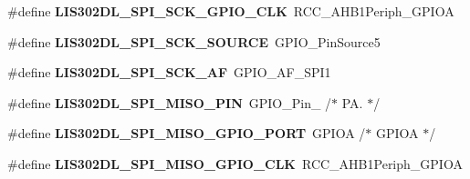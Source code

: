 \begin{DoxyCompactItemize}
\item 
\hypertarget{group___s_t_m32_f4___d_i_s_c_o_v_e_r_y___l_i_s302_d_l___exported___constants_ga1546d6ebad4510d071ac0bd6537f55fb}{\#define {\bfseries L\-I\-S302\-D\-L\-\_\-\-S\-P\-I\-\_\-\-S\-C\-K\-\_\-\-G\-P\-I\-O\-\_\-\-C\-L\-K}~R\-C\-C\-\_\-\-A\-H\-B1\-Periph\-\_\-\-G\-P\-I\-O\-A}\label{group___s_t_m32_f4___d_i_s_c_o_v_e_r_y___l_i_s302_d_l___exported___constants_ga1546d6ebad4510d071ac0bd6537f55fb}

\item 
\hypertarget{group___s_t_m32_f4___d_i_s_c_o_v_e_r_y___l_i_s302_d_l___exported___constants_gadffc69ec2188e3d3569cc56bb230a641}{\#define {\bfseries L\-I\-S302\-D\-L\-\_\-\-S\-P\-I\-\_\-\-S\-C\-K\-\_\-\-S\-O\-U\-R\-C\-E}~G\-P\-I\-O\-\_\-\-Pin\-Source5}\label{group___s_t_m32_f4___d_i_s_c_o_v_e_r_y___l_i_s302_d_l___exported___constants_gadffc69ec2188e3d3569cc56bb230a641}

\item 
\hypertarget{group___s_t_m32_f4___d_i_s_c_o_v_e_r_y___l_i_s302_d_l___exported___constants_ga4674468c4ea335d7075b1ea11dad0736}{\#define {\bfseries L\-I\-S302\-D\-L\-\_\-\-S\-P\-I\-\_\-\-S\-C\-K\-\_\-\-A\-F}~G\-P\-I\-O\-\_\-\-A\-F\-\_\-\-S\-P\-I1}\label{group___s_t_m32_f4___d_i_s_c_o_v_e_r_y___l_i_s302_d_l___exported___constants_ga4674468c4ea335d7075b1ea11dad0736}

\item 
\hypertarget{group___s_t_m32_f4___d_i_s_c_o_v_e_r_y___l_i_s302_d_l___exported___constants_gae967453756716d1539f0fa3e65fb0d82}{\#define {\bfseries L\-I\-S302\-D\-L\-\_\-\-S\-P\-I\-\_\-\-M\-I\-S\-O\-\_\-\-P\-I\-N}~G\-P\-I\-O\-\_\-\-Pin\-\_                  /$\ast$ P\-A. $\ast$/}\label{group___s_t_m32_f4___d_i_s_c_o_v_e_r_y___l_i_s302_d_l___exported___constants_gae967453756716d1539f0fa3e65fb0d82}

\item 
\hypertarget{group___s_t_m32_f4___d_i_s_c_o_v_e_r_y___l_i_s302_d_l___exported___constants_ga0a5a733b3c836e2a62cea259cce4e248}{\#define {\bfseries L\-I\-S302\-D\-L\-\_\-\-S\-P\-I\-\_\-\-M\-I\-S\-O\-\_\-\-G\-P\-I\-O\-\_\-\-P\-O\-R\-T}~G\-P\-I\-O\-A                       /$\ast$ G\-P\-I\-O\-A $\ast$/}\label{group___s_t_m32_f4___d_i_s_c_o_v_e_r_y___l_i_s302_d_l___exported___constants_ga0a5a733b3c836e2a62cea259cce4e248}

\item 
\hypertarget{group___s_t_m32_f4___d_i_s_c_o_v_e_r_y___l_i_s302_d_l___exported___constants_ga12d20b24d17f98a5e59336af9c0d53c4}{\#define {\bfseries L\-I\-S302\-D\-L\-\_\-\-S\-P\-I\-\_\-\-M\-I\-S\-O\-\_\-\-G\-P\-I\-O\-\_\-\-C\-L\-K}~R\-C\-C\-\_\-\-A\-H\-B1\-Periph\-\_\-\-G\-P\-I\-O\-A}\label{group___s_t_m32_f4___d_i_s_c_o_v_e_r_y___l_i_s302_d_l___exported___constants_ga12d20b24d17f98a5e59336af9c0d53c4}


\end{DoxyCompactItemize}

